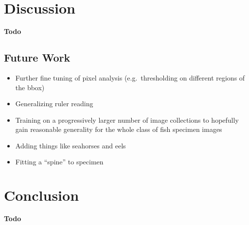 \documentclass[screen,review]{acmart}
\begin{document}

\section{Discussion}
\textbf{Todo}
\subsection{Future Work}
\begin{itemize}
    \item Further fine tuning of pixel analysis (e.g.\ thresholding on different regions of the bbox)
    \item Generalizing ruler reading
    \item Training on a progressively larger number of image collections to hopefully gain reasonable generality for the whole class of fish specimen images
    \item Adding things like seahorses and eels
    \item Fitting a ``spine'' to specimen
\end{itemize}
\section{Conclusion}
\textbf{Todo}



\end{document}
